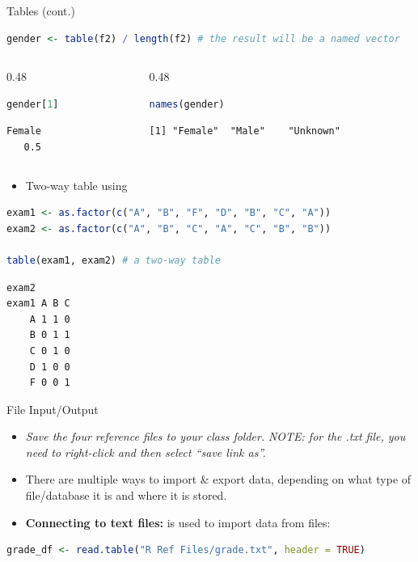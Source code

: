 \begin{frame}[fragile]{Tables (cont.)}
\begin{lstlisting}[language=R]
gender <- table(f2) / length(f2) # the result will be a named vector
\end{lstlisting}
\begin{columns}[T]
\begin{column}{0.48\textwidth}
\begin{lstlisting}[language=R]
gender[1]
\end{lstlisting}
\begin{lstlisting}[style=output]
Female 
   0.5
\end{lstlisting}
\end{column}
\begin{column}{0.48\textwidth}
\begin{lstlisting}[language=R]
names(gender)
\end{lstlisting}
\begin{lstlisting}[style=output]
[1] "Female"  "Male"    "Unknown"
\end{lstlisting}
\end{column}
\end{columns}
\begin{itemize}
  \item Two-way table using 
\end{itemize}
\begin{lstlisting}[language=R]
exam1 <- as.factor(c("A", "B", "F", "D", "B", "C", "A"))
exam2 <- as.factor(c("A", "B", "C", "A", "C", "B", "B"))

table(exam1, exam2) # a two-way table
\end{lstlisting}
\begin{lstlisting}[style=output]
     exam2
exam1 A B C
    A 1 1 0
    B 0 1 1
    C 0 1 0
    D 1 0 0
    F 0 0 1
\end{lstlisting}
\end{frame}

\begin{frame}[fragile]{File Input/Output}
\begin{itemize}
  \item \textit{Save the four reference files to your class folder.} \textit{NOTE: for the .txt file, you need to right-click and then select “save link as”.}
  \item There are multiple ways to import \& export data, depending on what type of file/database it is and where it is stored.
  \item \textbf{Connecting to text files:}  is used to import data from  files:
\end{itemize}
\begin{lstlisting}[language=R]
grade_df <- read.table("R Ref Files/grade.txt", header = TRUE)
\end{lstlisting}
\end{frame}

